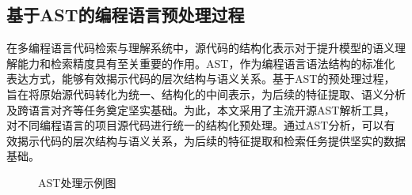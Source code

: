 \documentclass[UTF8,a4paper,12pt]{ctexart}
\numberwithin{equation}{section}
\begin{document}
\subsection{基于AST的编程语言预处理过程}
在多编程语言代码检索与理解系统中，源代码的结构化表示对于提升模型的语义理解能力和检索精度具有至关重要的作用。AST，作为编程语言语法结构的标准化表达方式，能够有效揭示代码的层次结构与语义关系。基于AST的预处理过程，旨在将原始源代码转化为统一、结构化的中间表示，为后续的特征提取、语义分析及跨语言对齐等任务奠定坚实基础。为此，本文采用了主流开源AST解析工具，对不同编程语言的项目源代码进行统一的结构化预处理。通过AST分析，可以有效揭示代码的层次结构与语义关系，为后续的特征提取和检索任务提供坚实的数据基础。\par
\begin{figure}[H]
	\caption{AST处理示例图}
	\label{ast_example}
\end{figure}
\end{document}

